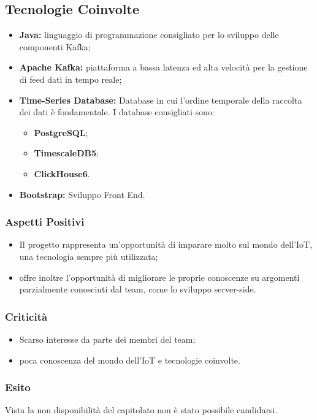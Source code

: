	\subsection{Tecnologie Coinvolte}
	\begin{itemize}
		\item \textbf{Java}\textbf{:} linguaggio di programmazione consigliato per lo sviluppo delle componenti Kafka; 
		\item \textbf{Apache Kafka}\textbf{:} piattaforma a bassa latenza ed alta velocità per la gestione di feed dati in tempo reale; 
		\item \textbf{Time-Series Database:} Database in cui l'ordine temporale della raccolta dei dati è fondamentale. I database consigliati sono:
			\begin{itemize}
			\item \textbf{PostgreSQL}; 
			\item \textbf{TimescaleDB5};
			\item \textbf{ClickHouse6}.
			\end{itemize}
		\item \textbf{Bootstrap}\textbf{:} Sviluppo Front End.
	\end{itemize}
	\subsubsection{Aspetti Positivi}
		\begin{itemize}
			\item Il progetto rappresenta un'opportunità di imparare molto sul mondo dell'IoT, una tecnologia sempre più utilizzata; 
			\item offre inoltre l'opportunità di migliorare le proprie conoscenze su argomenti parzialmente conosciuti dal team, come lo sviluppo server-side.
		\end{itemize} 
	\subsubsection{Criticità}
		\begin{itemize}
			\item Scarso interesse da parte dei membri del team; 
			\item poca conoscenza del mondo dell'IoT e tecnologie coinvolte.
		\end{itemize}
	\subsubsection{Esito}
	Vista la non disponibilità del capitolato non è stato possibile candidarsi.
		
		